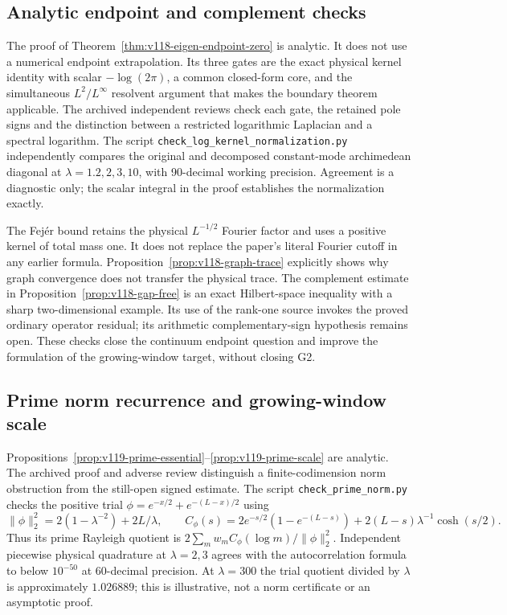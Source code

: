 \documentclass[11pt]{article}
\theoremstyle{remark}
\begin{document}
\subsection*{Analytic endpoint and complement checks}
The proof of Theorem~\ref{thm:v118-eigen-endpoint-zero} is analytic.
It does not use a numerical endpoint extrapolation. Its three gates are
the exact physical kernel identity with scalar $-\log(2\pi)$, a common
closed-form core, and the simultaneous $L^2/L^\infty$ resolvent argument
that makes the boundary theorem applicable. The archived independent
reviews check each gate, the retained pole signs and the distinction
between a restricted logarithmic Laplacian and a spectral logarithm.
The script \texttt{check\_log\_kernel\_normalization.py} independently
compares the original and decomposed constant-mode archimedean diagonal
at $\lambda=1.2,2,3,10$, with 90-decimal working precision. Agreement is
a diagnostic only; the scalar integral in the proof establishes the
normalization exactly.

The Fej\'er bound retains the physical $L^{-1/2}$ Fourier factor and
uses a positive kernel of total mass one. It does not replace the
paper's literal Fourier cutoff in any earlier formula.
Proposition~\ref{prop:v118-graph-trace} explicitly shows why graph
convergence does not transfer the physical trace.
The complement estimate in Proposition~\ref{prop:v118-gap-free}
is an exact Hilbert-space inequality with a sharp two-dimensional
example. Its use of the rank-one source invokes the proved ordinary
operator residual; its arithmetic complementary-sign hypothesis remains
open. These checks close the continuum endpoint question and improve
the formulation of the growing-window target, without closing G2.

\subsection*{Prime norm recurrence and growing-window scale}
Propositions~\ref{prop:v119-prime-essential}--\ref{prop:v119-prime-scale}
are analytic. The archived proof and adverse review distinguish a
finite-codimension norm obstruction from the still-open signed estimate.
The script \texttt{check\_prime\_norm.py} checks the positive trial
$\phi=e^{-x/2}+e^{-(L-x)/2}$ using
\[
 \|\phi\|_2^2=2(1-\lambda^{-2})+2L/\lambda,
 \qquad
 C_\phi(s)=2e^{-s/2}(1-e^{-(L-s)})
             +2(L-s)\lambda^{-1}\cosh(s/2).
\]
Thus its prime Rayleigh quotient is
$2\sum_m w_m C_\phi(\log m)/\|\phi\|_2^2$.
Independent piecewise physical quadrature at $\lambda=2,3$ agrees
with the autocorrelation formula to below $10^{-50}$ at 60-decimal
precision. At $\lambda=300$ the trial quotient divided by $\lambda$
is approximately $1.026889$; this is illustrative, not a norm certificate
or an asymptotic proof.
\end{document}

